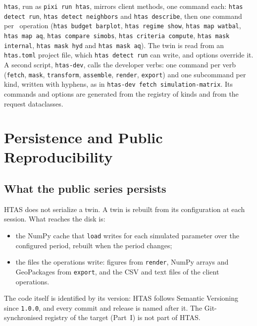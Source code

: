 \texttt{htas}, run as \texttt{pixi run htas}, mirrors client methods, one
command each: \texttt{htas detect run}, \texttt{htas detect neighbors} and
\texttt{htas describe}, then one command per \cwv\ operation
(\texttt{htas budget barplot}, \texttt{htas regime show}, \texttt{htas map watbal},
\texttt{htas map aq}, \texttt{htas compare simobs}, \texttt{htas criteria compute},
\texttt{htas mask internal}, \texttt{htas mask hyd} and \texttt{htas mask aq}).
The twin is read from an \texttt{htas.toml} project file, which
\texttt{htas detect run} can write, and options override it. A second
script, \texttt{htas-dev}, calls the developer verbs: one command per verb
(\texttt{fetch}, \texttt{mask}, \texttt{transform}, \texttt{assemble},
\texttt{render}, \texttt{export}) and one subcommand per kind, written with
hyphens, as in \texttt{htas-dev fetch simulation-matrix}. Its commands and
options are generated from the registry of kinds and from the request
dataclasses.


\section{Persistence and Public Reproducibility}

\subsection{What the public series persists}\label{p2c2_ssGitRec}

HTAS does not serialize a twin. A twin is rebuilt from its configuration at
each session. What reaches the disk is:

\begin{itemize}
    \item the NumPy cache that \texttt{load} writes for each simulated parameter over the configured period, rebuilt when the period changes;
    \item the files the operations write: figures from \texttt{render}, NumPy arrays and GeoPackages from \texttt{export}, and the CSV and text files of the client operations.
\end{itemize}

The code itself is identified by its version: HTAS follows Semantic Versioning
since \texttt{1.0.0}, and every commit and release is named after it. The
Git-synchronised registry of the target (Part~I) is not part of HTAS.

